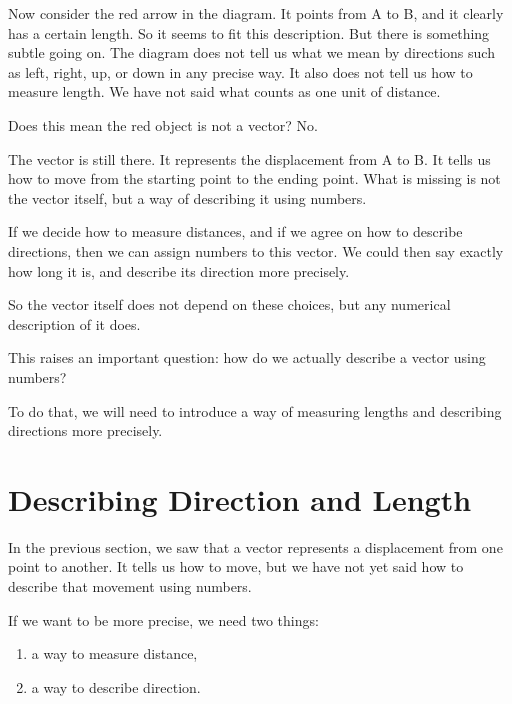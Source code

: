 \documentclass[11pt,openany]{book}
\theoremstyle{definition}
\begin{document}
\medskip

Now consider the red arrow in the diagram. It points from A to B, and it clearly has a certain length. 
So it seems to fit this description. But there is something subtle going on. The diagram does not tell us what we mean by directions such as left, right, up, or down in any precise way. 
It also does not tell us how to measure length. We have not said what counts as one unit of distance.

\medskip

Does this mean the red object is not a vector? No.

\medskip

The vector is still there. It represents the displacement from A to B. It tells us how to move from the starting point to the ending point. What is missing is not the vector itself, but a way of describing it using numbers.

\medskip

If we decide how to measure distances, and if we agree on how to describe directions, 
then we can assign numbers to this vector. We could then say exactly how long it is, 
and describe its direction more precisely.

\medskip

So the vector itself does not depend on these choices, but any numerical description of it does.

\medskip

This raises an important question: how do we actually describe a vector using numbers?

\medskip

To do that, we will need to introduce a way of measuring lengths and describing directions more precisely.

\section{Describing Direction and Length}

In the previous section, we saw that a vector represents a displacement from one point to another. 
It tells us how to move, but we have not yet said how to describe that movement using numbers.

\medskip

If we want to be more precise, we need two things:

\begin{enumerate}
  \item a way to measure distance,
  \item a way to describe direction.
\end{enumerate}
\end{document}
